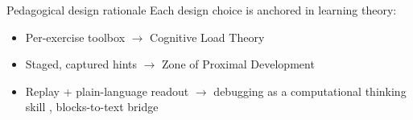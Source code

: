 \documentclass[11pt,t,usepdftitle=false,aspectratio=169]{beamer}
\begin{document}

\begin{frame}{Pedagogical design rationale}
  Each design choice is anchored in learning theory:
  \begin{itemize}
    \item Per-exercise toolbox $\rightarrow$ Cognitive Load Theory \cite{sweller1988}
    \item Staged, captured hints $\rightarrow$ Zone of Proximal Development \cite{Vygotsky1980}
    \item Replay + plain-language readout $\rightarrow$ debugging as a computational thinking skill
          \cite{brennan2012}, blocks-to-text bridge \cite{weintrop2015}
  \end{itemize}
\end{frame}
\end{document}
